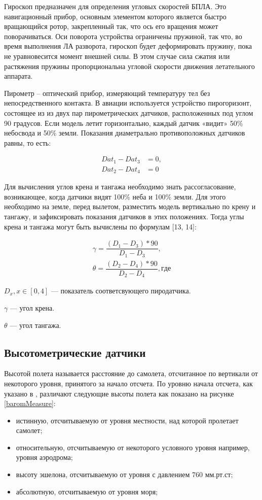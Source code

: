 \documentclass[pract, och, master]{SCWorks}
\begin{document}
Гироскоп предназначен для определения угловых скоростей БПЛА. Это навигационный прибор, основным элементом которого является быстро вращающийся ротор, закрепленный так, 
что ось его вращения может поворачиваться. Оси поворота устройства ограничены пружиной, так что, во время выполнения ЛА разворота, гироскоп будет деформировать 
пружину, пока не уравновесится момент внешней силы. В этом случае сила сжатия или растяжения пружины пропорциональна угловой скорости движения летательного аппарата.

Пирометр – оптический прибор, измеряющий температуру тел без непосредственного 
контакта. В авиации используется устройство пирогоризонт, состоящее из из двух 
пар пирометрических датчиков, расположенных под углом 90 градусов. 
Если модель летит горизонтально, каждый датчик «видит» 50\%
небосвода и 50\% земли. Показания диаметрально противоположных датчиков равны, то есть: 

\begin{align}
    Dat_1 - Dat_3 &= 0,\\
    Dat_2 - Dat_4 &= 0
\end{align}

 

Для вычисления углов крена и тангажа необходимо знать рассогласование, 
возникающее, когда датчики видят 100\% неба и 100\% земли. Для этого необходимо 
на земле, перед вылетом, разместить модель вертикально по крену и тангажу, и 
зафиксировать показания  датчиков в этих положениях. Тогда углы крена и тангажа 
могут быть вычислены по формулам [13, 14]: 

\begin{align}
\gamma = \dfrac{(D_1 - D_3) * 90 }{D_1 - D_3}, \\ \theta = \dfrac{(D_2 - D_4) * 90}{D_2 - D_4}, где
\end{align}

$D_x, x\in [0, 4]$ --- показатель соответсвующего пиродатчика.
 
$\gamma$ --- угол крена.

$\theta$ --- угол тангажа.

\subsection*{Высотометрические датчики}

Высотой полета называется расстояние до самолета, отсчитанное по вертикали от некоторого уровня, принятого за начало отсчета. 
По уровню начала отсчета, как указано в \cite{uavAvia}, различают следующие высоты полета как показано на рисунке \ref{baromMeasure}: 
\begin{itemize}
	\item истинную, отсчитываемую от уровня местности, над которой пролетает самолет;
	\item относительную, отсчитываемую от некоторого условного уровня например, уровня аэродрома;
	\item высоту эшелона, отсчитываемую от уровня с давлением 760 мм.рт.ст; 
	\item абсолютную, отсчитываемую от уровня моря;
\end{itemize}
\end{document}
